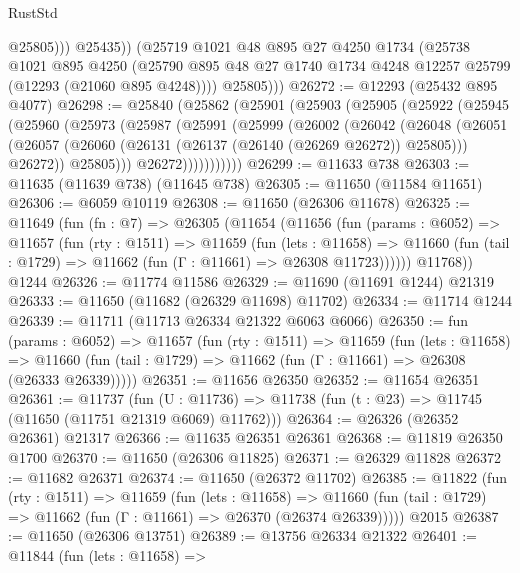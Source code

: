 \begin{lexlean}{RustStd}
\begin{coremodule}
                  @25805)))
            @25435))
        (@25719
          @1021
          @48
          @895
          @27
          @4250
          @1734
          (@25738
            @1021
            @895
            @4250
            (@25790 @895 @48 @27 @1740 @1734 @4248 @12257 @25799 (@12293 (@21060 @895 @4248))))
          @25805)))
@26272 := @12293 (@25432 @895 @4077)
@26298 := @25840
    (@25862
      (@25901
        (@25903
          (@25905
            (@25922
              (@25945
                (@25960
                  (@25973
                    (@25987
                      (@25991
                        (@25999
                          (@26002
                            (@26042
                              (@26048
                                (@26051
                                  (@26057
                                    (@26060 (@26131 (@26137 (@26140 (@26269 @26272)) @25805)))
                                    @26272))
                                @25805)))
                          @26272)))))))))))
@26299 := @11633 @738
@26303 := @11635 (@11639 @738) (@11645 @738)
@26305 := @11650 (@11584 @11651)
@26306 := @6059 @10119
@26308 := @11650 (@26306 @11678)
@26325 := @11649
    (fun (fn : @7) =>
    @26305
      (@11654
        (@11656
          (fun (params : @6052) =>
          @11657
            (fun (rty : @1511) =>
            @11659
              (fun (lets : @11658) =>
              @11660 (fun (tail : @1729) => @11662 (fun (Γ : @11661) => @26308 @11723))))))
        @11768))
    @1244
@26326 := @11774 @11586
@26329 := @11690 (@11691 @1244) @21319
@26333 := @11650 (@11682 (@26329 @11698) @11702)
@26334 := @11714 @1244
@26339 := @11711 (@11713 @26334 @21322 @6063 @6066)
@26350 := fun (params : @6052) =>
  @11657
    (fun (rty : @1511) =>
    @11659
      (fun (lets : @11658) =>
      @11660 (fun (tail : @1729) => @11662 (fun (Γ : @11661) => @26308 (@26333 @26339)))))
@26351 := @11656 @26350
@26352 := @11654 @26351
@26361 := @11737
    (fun (U : @11736) => @11738 (fun (t : @23) => @11745 (@11650 (@11751 @21319 @6069) @11762)))
@26364 := @26326 (@26352 @26361) @21317
@26366 := @11635 @26351 @26361
@26368 := @11819 @26350 @1700
@26370 := @11650 (@26306 @11825)
@26371 := @26329 @11828
@26372 := @11682 @26371
@26374 := @11650 (@26372 @11702)
@26385 := @11822
    (fun (rty : @1511) =>
    @11659
      (fun (lets : @11658) =>
      @11660 (fun (tail : @1729) => @11662 (fun (Γ : @11661) => @26370 (@26374 @26339)))))
    @2015
@26387 := @11650 (@26306 @13751)
@26389 := @13756 @26334 @21322
@26401 := @11844
    (fun (lets : @11658) =>

\end{coremodule}
\end{lexlean}
